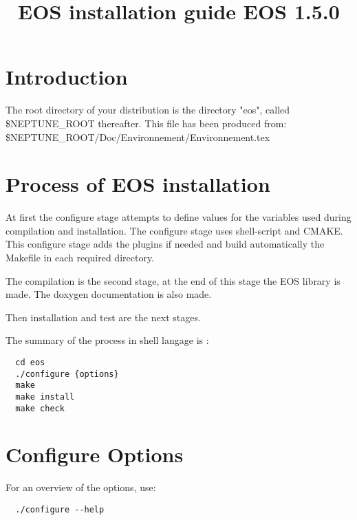 \documentclass[12pt,a4paper]{article}
\title{EOS installation guide EOS 1.5.0}
\begin{document}
\maketitle
\vspace{2.cm}
\tableofcontents

\newpage
%
\section{Introduction}
%
The root directory of your distribution is the directory "eos", called
\$NEPTUNE\_ROOT thereafter.
This file has been produced from: \\
\$NEPTUNE\_ROOT/Doc/Environnement/Environnement.tex

%
\section {Process of EOS installation}
%
At first the configure stage attempts to define values for the variables used
during compilation and installation. The configure stage uses shell-script
and CMAKE.  This configure stage adds the plugins if needed and build 
automatically the Makefile in each required directory. 

The compilation is the second stage, at the end of this stage the EOS library
is made. The doxygen documentation is also made.

Then installation and test are the next stages. 

The summary of the process in shell langage is :
\begin{verbatim}
  cd eos
  ./configure {options}
  make
  make install
  make check
\end{verbatim}

\section {Configure Options}

For an overview of the options, use:
\begin{verbatim}
  ./configure --help
\end{verbatim}
\end{document}
